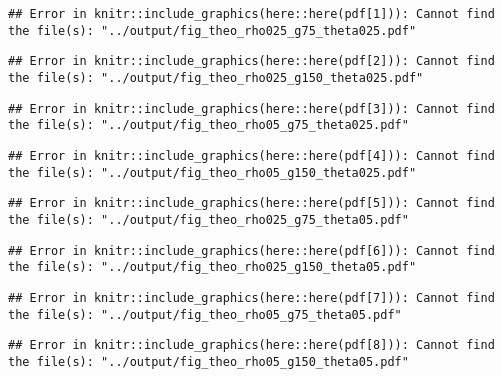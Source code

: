 \begin{verbatim}
## Error in knitr::include_graphics(here::here(pdf[1])): Cannot find the file(s): "../output/fig_theo_rho025_g75_theta025.pdf"
\end{verbatim}

\newpage

\begin{verbatim}
## Error in knitr::include_graphics(here::here(pdf[2])): Cannot find the file(s): "../output/fig_theo_rho025_g150_theta025.pdf"
\end{verbatim}

\newpage

\begin{verbatim}
## Error in knitr::include_graphics(here::here(pdf[3])): Cannot find the file(s): "../output/fig_theo_rho05_g75_theta025.pdf"
\end{verbatim}

\newpage

\begin{verbatim}
## Error in knitr::include_graphics(here::here(pdf[4])): Cannot find the file(s): "../output/fig_theo_rho05_g150_theta025.pdf"
\end{verbatim}

\newpage

\begin{verbatim}
## Error in knitr::include_graphics(here::here(pdf[5])): Cannot find the file(s): "../output/fig_theo_rho025_g75_theta05.pdf"
\end{verbatim}

\newpage

\begin{verbatim}
## Error in knitr::include_graphics(here::here(pdf[6])): Cannot find the file(s): "../output/fig_theo_rho025_g150_theta05.pdf"
\end{verbatim}

\newpage

\begin{verbatim}
## Error in knitr::include_graphics(here::here(pdf[7])): Cannot find the file(s): "../output/fig_theo_rho05_g75_theta05.pdf"
\end{verbatim}

\newpage

\begin{verbatim}
## Error in knitr::include_graphics(here::here(pdf[8])): Cannot find the file(s): "../output/fig_theo_rho05_g150_theta05.pdf"
\end{verbatim}

\newpage
